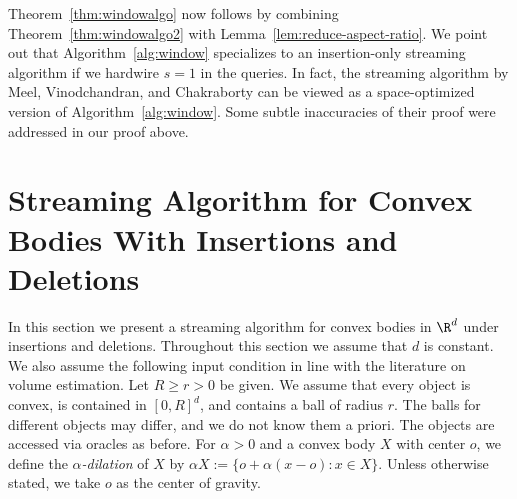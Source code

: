 %
Theorem~\ref{thm:windowalgo} now follows by combining Theorem~\ref{thm:windowalgo2} with Lemma~\ref{lem:reduce-aspect-ratio}.
%
We point out that Algorithm~\ref{alg:window} specializes to an insertion-only streaming algorithm if we hardwire $s = 1$ in the queries. In fact, the streaming algorithm by Meel, Vinodchandran, and Chakraborty \cite{MVC21} can be viewed as a space-optimized version of Algorithm~\ref{alg:window}. Some subtle inaccuracies of their proof were addressed in our proof above.
%
%
\section{Streaming Algorithm for Convex Bodies With Insertions and Deletions}
\label{sec:convex}
In this section we present a streaming algorithm for convex bodies in $\R^d$ under insertions and deletions. Throughout this section we assume that $d$ is constant. We also assume the following input condition in line with the literature on volume estimation. Let $R \geq r > 0$ be given. We assume that every object is convex, is contained in $[0,R]^d$, and contains a ball of radius $r$. The balls for different objects may differ, and we do not know them a priori. The objects are accessed via oracles as before.
%
For $\alpha > 0$ and a convex body $X$ with center $o$, we define the \emph{$\alpha$-dilation} of $X$ by $\alpha X := \{ o + \alpha (x-o) : x \in X \}$. Unless otherwise stated, we take $o$ as the center of gravity.
%
